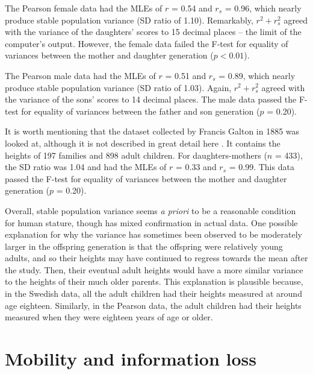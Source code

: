 \documentclass[letterpaper,10pt]{article} %
\begin{document}
The Pearson female data had the MLEs of $r$ = 0.54 and $r_s$ = 0.96, which nearly produce stable population variance (SD ratio of 1.10). Remarkably, $r^2 + r_s^2$ agreed with the variance of the daughters' scores to 15 decimal places -- the limit of the computer's output. However, the female data failed the F-test for equality of variances between the mother and daughter generation ($p < 0.01$). 

The Pearson male data had the MLEs of $r$ = 0.51 and $r_s$ = 0.89, which nearly produce stable population variance (SD ratio of 1.03). Again, $r^2 + r_s^2$ agreed with the variance of the sons' scores to 14 decimal places. The male data passed the F-test for equality of variances between the father and son generation ($p$ = 0.20). 

It is worth mentioning that the dataset collected by Francis Galton in 1885 was looked at, although it is not described in great detail here \cite{galton}. It contains the heights of 197 families and 898 adult children. For daughters-mothers ($n$ = 433), the SD ratio was 1.04 and had the MLEs of $r$ = 0.33 and $r_s$ = 0.99. This data passed the F-test for equality of variances between the mother and daughter generation ($p$ = 0.20). 

Overall, stable population variance seems \emph{a priori} to be a reasonable condition for human stature, though has mixed confirmation in actual data. One possible explanation for why the variance has sometimes been observed to be moderately larger in the offspring generation is that the offspring were relatively young adults, and so their heights may have continued to regress towards the mean after the study. Then, their eventual adult heights would have a more similar variance to the heights of their much older parents. This explanation is plausible because, in the Swedish data, all the adult children had their heights measured at around age eighteen. Similarly, in the Pearson data, the adult children had their heights measured when they were eighteen years of age or older. 










\section{Mobility and information loss}
\end{document}
